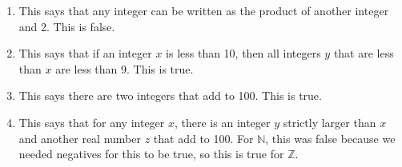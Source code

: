 \documentclass{article}
\begin{document}
\begin{enumerate}
\begin{enumerate}
  \item This says that any integer can be written as the product of another integer and 2.  This is false.
  \item This says that if an integer $x$ is less than 10, then all integers $y$ that are less than $x$ are less than 9.  This is true.
  \item This says there are two integers that add to 100.  This is true.
  \item This says that for any integer $x$, there is an integer $y$ strictly larger than $x$ and another real number $z$ that add to 100.  For $\mathbb{N}$, this was false because we needed negatives for this to be true, so this is true for $\mathbb{Z}$.
  \end{enumerate}
\end{enumerate}
\end{document}
